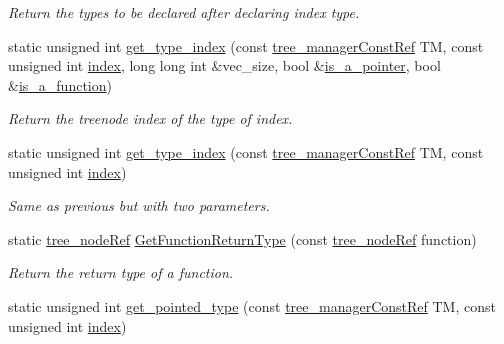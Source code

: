 \begin{DoxyCompactItemize}
\begin{DoxyCompactList}\small\item\em Return the types to be declared after declaring index type. \end{DoxyCompactList}\item 
static unsigned int \hyperlink{classtree__helper_a4be4d473adb56f120981a29eda1bf3cc}{get\+\_\+type\+\_\+index} (const \hyperlink{tree__manager_8hpp_a792e3f1f892d7d997a8d8a4a12e39346}{tree\+\_\+manager\+Const\+Ref} TM, const unsigned int \hyperlink{tutorial__pact__2019_2Introduction_2third_2include_2Keccak_8h_a028c9bdc8344cca38ab522a337074797}{index}, long long int \&vec\+\_\+size, bool \&\hyperlink{classtree__helper_a45e95e6b9cc351e7ecbd7837c0388e0a}{is\+\_\+a\+\_\+pointer}, bool \&\hyperlink{classtree__helper_aa6612c96f6dd64598da3311387939635}{is\+\_\+a\+\_\+function})
\begin{DoxyCompactList}\small\item\em Return the treenode index of the type of index. \end{DoxyCompactList}\item 
static unsigned int \hyperlink{classtree__helper_a6c8eec89f27115651412d6dbaa194bc8}{get\+\_\+type\+\_\+index} (const \hyperlink{tree__manager_8hpp_a792e3f1f892d7d997a8d8a4a12e39346}{tree\+\_\+manager\+Const\+Ref} TM, const unsigned int \hyperlink{tutorial__pact__2019_2Introduction_2third_2include_2Keccak_8h_a028c9bdc8344cca38ab522a337074797}{index})
\begin{DoxyCompactList}\small\item\em Same as previous but with two parameters. \end{DoxyCompactList}\item 
static \hyperlink{tree__node_8hpp_a6ee377554d1c4871ad66a337eaa67fd5}{tree\+\_\+node\+Ref} \hyperlink{classtree__helper_a9e9972b08d71d6f422189619714c5067}{Get\+Function\+Return\+Type} (const \hyperlink{tree__node_8hpp_a6ee377554d1c4871ad66a337eaa67fd5}{tree\+\_\+node\+Ref} function)
\begin{DoxyCompactList}\small\item\em Return the return type of a function. \end{DoxyCompactList}\item 
static unsigned int \hyperlink{classtree__helper_a44773dce45000b8e7283c452ff972dc1}{get\+\_\+pointed\+\_\+type} (const \hyperlink{tree__manager_8hpp_a792e3f1f892d7d997a8d8a4a12e39346}{tree\+\_\+manager\+Const\+Ref} TM, const unsigned int \hyperlink{tutorial__pact__2019_2Introduction_2third_2include_2Keccak_8h_a028c9bdc8344cca38ab522a337074797}{index})

\end{DoxyCompactItemize}

